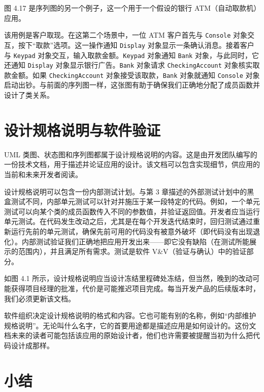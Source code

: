 图 4.17 是序列图的另一个例子，这一个用于一个假设的银行 ATM（自动取款机）应用。


该用例是客户取现。在这第二个场景中，一位 ATM 客户首先与 \texttt{Console} 对象交互，按下“取款”选项。这一操作通知 \texttt{Display} 对象显示一条确认消息。接着客户与 \texttt{Keypad} 对象交互，输入取款金额。\texttt{Keypad} 对象通知 \texttt{Bank} 对象，与此同时，它还通知 \texttt{Display} 对象显示银行广告。\texttt{Bank} 对象请求 \texttt{Checking\allowbreak{}Account} 对象核实取款金额。如果 \texttt{Checking\allowbreak{}Account} 对象接受该取款，\texttt{Bank} 对象就通知 \texttt{Console} 对象启动出钞。与前面的序列图一样，这张图有助于确保我们正确地分配了成员函数并设计了类关系。

\section{设计规格说明与软件验证}

UML 类图、状态图和序列图都属于设计规格说明的内容。这是由开发团队编写的一份技术文档，用于描述并论证应用的设计。该文档可以包含实现细节，供应用的当前和未来开发者阅读。

设计规格说明可以包含一份内部测试计划。与第 3 章描述的外部测试计划中的黑盒测试不同，内部单元测试可以针对并施压于某一段特定的代码。例如，一个单元测试可以向某个类的成员函数传入不同的参数值，并验证返回值。开发者应当运行单元测试。在代码发生改动之后，尤其是在每个开发迭代结束时，回归测试通过重新运行先前的单元测试，确保先前可用的代码没有被意外破坏（即代码没有出现退化）。内部测试验证我们正确地把应用开发出来——即它没有缺陷（在测试所能展示的范围内），并且满足所有需求。测试是软件 V\&V（验证与确认）中的验证部分。

如图 4.1 所示，设计规格说明应当设计冻结里程碑处冻结，但当然，晚到的改动可能获得项目经理的批准，代价是可能推迟项目完成。每当开发产品的后续版本时，我们必须更新该文档。

软件组织决定设计规格说明的格式和内容。它也可能有别的名称，例如“内部维护规格说明”。无论叫什么名字，它的首要用途都是描述应用是如何设计的。这份文档未来的读者可能包括该应用的原始设计者，他们也许需要被提醒当初为什么把代码设计成那样。

\section*{小结}

